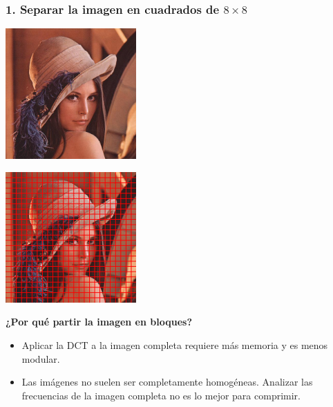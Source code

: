 \documentclass{beamer}
\begin{document}
\begin{frame}
    \frametitle{1. Separar la imagen en cuadrados de $8 \times 8$}
    \begin{minipage}[t]{0.48\linewidth}
        \includegraphics[width=5cm, height=5cm]{fig/lena.jpg}
    \end{minipage}
    \hfill
    \begin{minipage}[t]{0.48\linewidth}
        \includegraphics[width=5cm, height=5cm]{fig/lena_blocks.png}
    \end{minipage}
\end{frame}

\begin{frame}
    \textbf{¿Por qué partir la imagen en bloques?}
    \begin{itemize}
        \item Aplicar la DCT a la imagen completa requiere más memoria y es menos modular. %
        \item Las imágenes no suelen ser completamente homogéneas. Analizar las frecuencias de la imagen completa no es lo mejor para comprimir.
    \end{itemize}
\end{frame}
\end{document}
